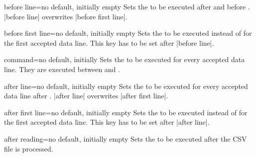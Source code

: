 \documentclass[a4paper,11pt]{ltxdoc}
\begin{document}
\begin{docCsvKey}{before line}{=}{no default, initially empty}
  Sets the  to be executed after 
  and before .
  |before line| overwrites |before first line|.
\end{docCsvKey}


\begin{docCsvKey}{before first line}{=}{no default, initially empty}
  Sets the  to be executed instead of 
  for the first accepted data line.
  This key has to be set after |before line|.
\end{docCsvKey}


\begin{docCsvKey}{command}{=}{no default, initially }
  Sets the  to be executed for every accepted data line.
  They are executed between  and .
\end{docCsvKey}


\begin{docCsvKey}{after line}{=}{no default, initially empty}
  Sets the  to be executed for every accepted data line
  after .
  |after line| overwrites |after first line|.
\end{docCsvKey}


\begin{docCsvKey}{after first line}{=}{no default, initially empty}
  Sets the  to be executed instead of 
  for the first accepted data line.
  This key has to be set after |after line|.
\end{docCsvKey}

\begin{docCsvKey}{after reading}{=}{no default, initially empty}
  Sets the  to be executed after the CSV file is processed.
\end{docCsvKey}


\begin{dispExample}
%
\end{dispExample}
\end{document}
